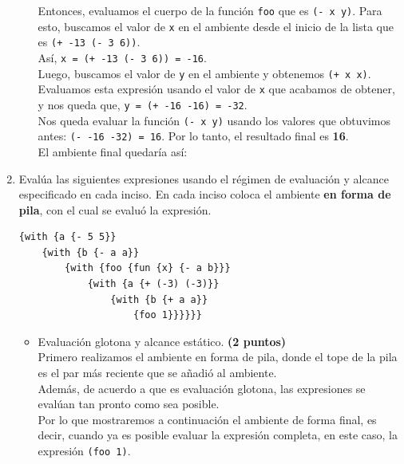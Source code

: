 \documentclass[11pt]{article}
\begin{document}
\begin{enumerate}[leftmargin=0.8cm]
\begin{itemize}
            Entonces, evaluamos el cuerpo de la función \texttt{foo} que es \texttt{(- x y)}. Para esto, buscamos el valor de \texttt{x} en el ambiente desde el inicio de la lista que es \texttt{(+ -13 (- 3 6))}.\\
            Así, \texttt{x = (+ -13 (- 3 6)) = -16}.\\
            Luego, buscamos el valor de \texttt{y} en el ambiente y obtenemos \texttt{(+ x x)}. Evaluamos esta expresión usando el valor de \texttt{x} que acabamos de obtener, y nos queda que, \texttt{y = (+ -16 -16) = -32}.\\
            Nos queda evaluar la función \texttt{(- x y)} usando los valores que obtuvimos antes: \texttt{(- -16 -32) = 16}. Por lo tanto, el resultado final es \textbf{16}.\\
            El ambiente final quedaría así:\\
            \hspace*{-1cm}
    \end{itemize}
    \item Evalúa las siguientes expresiones usando el régimen de evaluación y alcance especificado en cada inciso. En cada inciso coloca el ambiente \textbf{en forma de pila}, con el cual se evaluó la expresión.
    \begin{lstlisting}
{with {a {- 5 5}}
    {with {b {- a a}}
        {with {foo {fun {x} {- a b}}}
            {with {a {+ (-3) (-3)}}
                {with {b {+ a a}}
                    {foo 1}}}}}}
    \end{lstlisting}
    \begin{itemize}
        \item Evaluación glotona y alcance estático. \textbf{(2 puntos)}\\
        Primero realizamos el ambiente en forma de pila, donde el tope de la pila es el par más reciente que se añadió al ambiente.\\
        Además, de acuerdo a que es evaluación glotona, las expresiones se evalúan tan pronto como sea posible.\\
        Por lo que mostraremos a continuación el ambiente de forma final, es decir, cuando ya es posible evaluar la expresión completa, en este caso, la expresión \texttt{(foo 1)}.\\
        \begin{center}


\end{center}
\end{itemize}
\end{enumerate}
\end{document}
